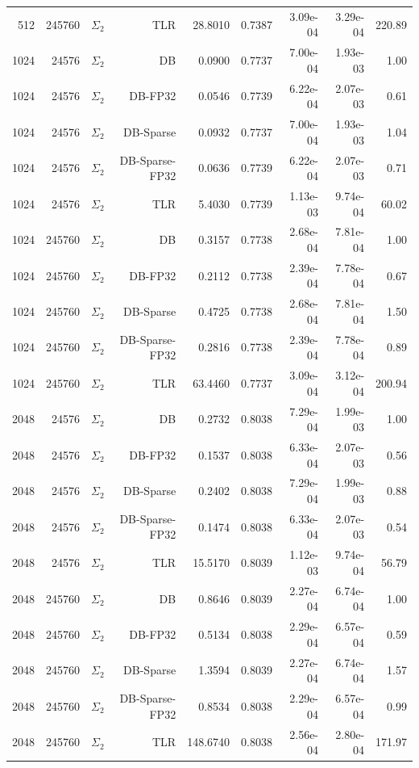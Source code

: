 \begin{tabular}{|r|r|r|r|r|r|r|r|r|}
  512 & 245760 & $\Sigma_2$ & TLR & 28.8010 & 0.7387 & 3.09e-04 & 3.29e-04 & 220.89 \\
  1024 & 24576 & $\Sigma_2$ & DB & 0.0900 & 0.7737 & 7.00e-04 & 1.93e-03 & 1.00 \\
  1024 & 24576 & $\Sigma_2$ & DB-FP32 & 0.0546 & 0.7739 & 6.22e-04 & 2.07e-03 & 0.61 \\
  1024 & 24576 & $\Sigma_2$ & DB-Sparse & 0.0932 & 0.7737 & 7.00e-04 & 1.93e-03 & 1.04 \\
  1024 & 24576 & $\Sigma_2$ & DB-Sparse-FP32 & 0.0636 & 0.7739 & 6.22e-04 & 2.07e-03 & 0.71 \\
  1024 & 24576 & $\Sigma_2$ & TLR & 5.4030 & 0.7739 & 1.13e-03 & 9.74e-04 & 60.02 \\
  1024 & 245760 & $\Sigma_2$ & DB & 0.3157 & 0.7738 & 2.68e-04 & 7.81e-04 & 1.00 \\
  1024 & 245760 & $\Sigma_2$ & DB-FP32 & 0.2112 & 0.7738 & 2.39e-04 & 7.78e-04 & 0.67 \\
  1024 & 245760 & $\Sigma_2$ & DB-Sparse & 0.4725 & 0.7738 & 2.68e-04 & 7.81e-04 & 1.50 \\
  1024 & 245760 & $\Sigma_2$ & DB-Sparse-FP32 & 0.2816 & 0.7738 & 2.39e-04 & 7.78e-04 & 0.89 \\
  1024 & 245760 & $\Sigma_2$ & TLR & 63.4460 & 0.7737 & 3.09e-04 & 3.12e-04 & 200.94 \\
  2048 & 24576 & $\Sigma_2$ & DB & 0.2732 & 0.8038 & 7.29e-04 & 1.99e-03 & 1.00 \\
  2048 & 24576 & $\Sigma_2$ & DB-FP32 & 0.1537 & 0.8038 & 6.33e-04 & 2.07e-03 & 0.56 \\
  2048 & 24576 & $\Sigma_2$ & DB-Sparse & 0.2402 & 0.8038 & 7.29e-04 & 1.99e-03 & 0.88 \\
  2048 & 24576 & $\Sigma_2$ & DB-Sparse-FP32 & 0.1474 & 0.8038 & 6.33e-04 & 2.07e-03 & 0.54 \\
  2048 & 24576 & $\Sigma_2$ & TLR & 15.5170 & 0.8039 & 1.12e-03 & 9.74e-04 & 56.79 \\
  2048 & 245760 & $\Sigma_2$ & DB & 0.8646 & 0.8039 & 2.27e-04 & 6.74e-04 & 1.00 \\
  2048 & 245760 & $\Sigma_2$ & DB-FP32 & 0.5134 & 0.8038 & 2.29e-04 & 6.57e-04 & 0.59 \\
  2048 & 245760 & $\Sigma_2$ & DB-Sparse & 1.3594 & 0.8039 & 2.27e-04 & 6.74e-04 & 1.57 \\
  2048 & 245760 & $\Sigma_2$ & DB-Sparse-FP32 & 0.8534 & 0.8038 & 2.29e-04 & 6.57e-04 & 0.99 \\
  2048 & 245760 & $\Sigma_2$ & TLR & 148.6740 & 0.8038 & 2.56e-04 & 2.80e-04 & 171.97 \\

\end{tabular}
